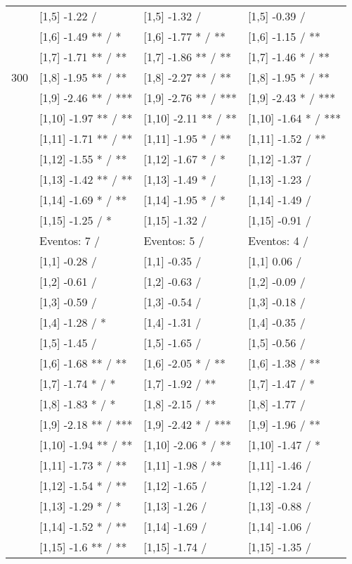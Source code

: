 \begin{table}
\begin{tabular}[t]{llll}
 & {}[1,5] -1.22  / & {}[1,5] -1.32  / & {}[1,5] -0.39  /\\
 & {}[1,6] -1.49 ** / * & {}[1,6] -1.77 * / ** & {}[1,6] -1.15  / **\\
 & {}[1,7] -1.71 ** / ** & {}[1,7] -1.86 ** / ** & {}[1,7] -1.46 * / **\\
300 & {}[1,8] -1.95 ** / ** & {}[1,8] -2.27 ** / ** & {}[1,8] -1.95 * / **\\
\addlinespace
 & {}[1,9] -2.46 ** / *** & {}[1,9] -2.76 ** / *** & {}[1,9] -2.43 * / ***\\
 & {}[1,10] -1.97 ** / ** & {}[1,10] -2.11 ** / ** & {}[1,10] -1.64 * / ***\\
 & {}[1,11] -1.71 ** / ** & {}[1,11] -1.95 * / ** & {}[1,11] -1.52  / **\\
 & {}[1,12] -1.55 * / ** & {}[1,12] -1.67 * / * & {}[1,12] -1.37  /\\
 & {}[1,13] -1.42 ** / ** & {}[1,13] -1.49 * / & {}[1,13] -1.23  /\\
\addlinespace
 & {}[1,14] -1.69 * / ** & {}[1,14] -1.95 * / * & {}[1,14] -1.49  /\\
 & {}[1,15] -1.25  / * & {}[1,15] -1.32  / & {}[1,15] -0.91  /\\
 & Eventos:  7 / & Eventos:  5 / & Eventos:  4 /\\
 & {}[1,1] -0.28  / & {}[1,1] -0.35  / & {}[1,1] 0.06  /\\
 & {}[1,2] -0.61  / & {}[1,2] -0.63  / & {}[1,2] -0.09  /\\
\addlinespace
 & {}[1,3] -0.59  / & {}[1,3] -0.54  / & {}[1,3] -0.18  /\\
 & {}[1,4] -1.28  / * & {}[1,4] -1.31  / & {}[1,4] -0.35  /\\
 & {}[1,5] -1.45  / & {}[1,5] -1.65  / & {}[1,5] -0.56  /\\
 & {}[1,6] -1.68 ** / ** & {}[1,6] -2.05 * / ** & {}[1,6] -1.38  / **\\
 & {}[1,7] -1.74 * / * & {}[1,7] -1.92  / ** & {}[1,7] -1.47  / *\\
\addlinespace
500 & {}[1,8] -1.83 * / * & {}[1,8] -2.15  / ** & {}[1,8] -1.77  /\\
 & {}[1,9] -2.18 ** / *** & {}[1,9] -2.42 * / *** & {}[1,9] -1.96  / **\\
 & {}[1,10] -1.94 ** / ** & {}[1,10] -2.06 * / ** & {}[1,10] -1.47  / *\\
 & {}[1,11] -1.73 * / ** & {}[1,11] -1.98  / ** & {}[1,11] -1.46  /\\
 & {}[1,12] -1.54 * / ** & {}[1,12] -1.65  / & {}[1,12] -1.24  /\\
\addlinespace
 & {}[1,13] -1.29 * / * & {}[1,13] -1.26  / & {}[1,13] -0.88  /\\
 & {}[1,14] -1.52 * / ** & {}[1,14] -1.69  / & {}[1,14] -1.06  /\\
 & {}[1,15] -1.6 ** / ** & {}[1,15] -1.74  / & {}[1,15] -1.35  /\\
\bottomrule
\end{tabular}
\end{table}
